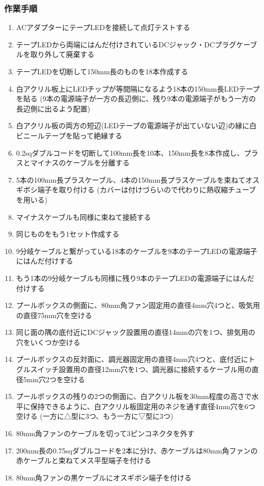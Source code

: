 \documentclass[titlepage,10pt,a4paper,uplatex]{jsbook}
\begin{document}
\subsubsection{作業手順}
\begin{enumerate}
\item ACアダプターにテープLEDを接続して点灯テストする
\item テープLEDから両端にはんだ付けされているDCジャック・DCプラグケーブルを取り外して廃棄する
\item テープLEDを切断して150mm長のものを18本作成する
\item 白アクリル板上にLEDチップが等間隔になるよう18本の150mm長LEDテープを貼る (9本の電源端子が一方の長辺側に、残り9本の電源端子がもう一方の長辺側に出るよう配置)
\item 白アクリル板の両方の短辺(LEDテープの電源端子が出ていない辺)の縁に白ビニールテープを貼って絶縁する
\item 0.2sqダブルコードを切断して100mm長を10本、150mm長を8本作成し、プラスとマイナスのケーブルを分離する
\item 5本の100mm長プラスケーブル、4本の150mm長プラスケーブルを束ねてオスギボシ端子を取り付ける (カバーは付けづらいので代わりに熱収縮チューブを用いる)
\item マイナスケーブルも同様に束ねて接続する
\item 同じものをもう1セット作成する
\item 9分岐ケーブルと繋がっている18本のケーブルを9本のテープLEDの電源端子にはんだ付けする
\item もう1本の9分岐ケーブルも同様に残り9本のテープLEDの電源端子にはんだ付けする
\item プールボックスの側面に、80mm角ファン固定用の直径4mm穴4つと、吸気用の直径75mm穴を空ける
\item 同じ面の隅の底付近にDCジャック設置用の直径14mmの穴を1つ、排気用の穴をいくつか空ける
\item プールボックスの反対面に、調光器固定用の直径4mm穴4つと、底付近にトグルスイッチ設置用の直径12mm穴を1つ、調光器に接続するケーブル用の直径5mm穴2つを空ける
\item プールボックスの残りの2つの側面に、白アクリル板を30mm程度の高さで水平に保持できるように、白アクリル板固定用のネジを通す直径4mm穴を6つ空ける (一方に△型に3つ、もう一方に▽型に3つ)
\item 80mm角ファンのケーブルを切って3ピンコネクタを外す
\item 200mm長の0.75sqダブルコードを2本に分け、赤ケーブルは80mm角ファンの赤ケーブルと束ねてメス平型端子を付ける
\item 80mm角ファンの黒ケーブルにオスギボシ端子を付ける

\end{enumerate}
\end{document}
